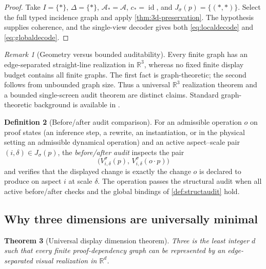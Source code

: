 \documentclass[11pt]{article}
\newcommand{\R}{\mathbb R}
\newcommand{\Rthree}{\ensuremath{\mathbb R^3}}
\newcommand{\mcA}{\mathcal A}
\theoremstyle{plain}
\newtheorem{theorem}{Theorem}[section]
\theoremstyle{definition}
\newtheorem{definition}[theorem]{Definition}
\theoremstyle{remark}
\newtheorem{remark}[theorem]{Remark}
\begin{document}
\begin{proof}
Take $I=\{*\}$, $\Delta=\{*\}$, $\mcA_*=\mcA$, $c_*=\operatorname{id}$, and
$J_\sigma(p)=\{(*,*)\}$.  Select the full typed incidence graph and apply
\cref{thm:3d-preservation}.  The hypothesis supplies coherence, and the
single-view decoder gives both \eqref{eq:localdecode} and
\eqref{eq:globaldecode}.
\end{proof}

\begin{remark}[Geometry versus bounded auditability]
\label{rem:geometry-vs-interface}
Every finite graph has an edge-separated straight-line realization in
$\Rthree$, whereas no fixed finite display budget contains all finite graphs.
The first fact is graph-theoretic; the second follows from unbounded graph size.
Thus a universal $\Rthree$ realization theorem and a bounded single-screen
audit theorem are distinct claims.  Standard graph-theoretic background is
available in \cite{Diestel2017}.
\end{remark}

\begin{definition}[Before/after audit comparison]
\label{def:beforeafter}
For an admissible operation $o$ on proof states (an inference step, a rewrite,
an instantiation, or in the physical setting an admissible dynamical operation)
and an active aspect--scale pair $(i,\delta)\in J_\sigma(p)$, the
\emph{before/after audit} inspects the pair
\[
  \bigl(V^\sigma_{i,\delta}(p),\, V^\sigma_{i,\delta}(o\cdot p)\bigr)
\]
and verifies that the displayed change is exactly the change $o$ is declared to
produce on aspect $i$ at scale $\delta$.  The operation passes the structural
audit when all active before/after checks and the global bindings of
\cref{def:structaudit} hold.
\end{definition}

\subsection{Why three dimensions are universally minimal}

\begin{theorem}[Universal display dimension theorem]
\label{thm:dimension}
Three is the least integer $d$ such that every finite proof-dependency graph can be represented by an edge-separated visual realization in $\R^d$.
\end{theorem}
\end{document}
